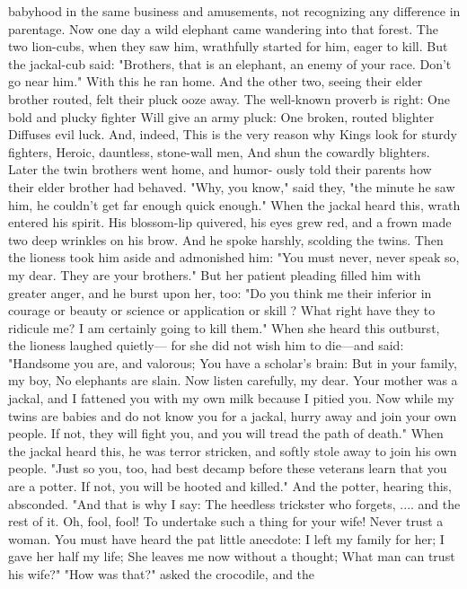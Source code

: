 \documentclass{book}
\begin{document}
babyhood in the same business and amusements, not
recognizing any difference in parentage.
Now one day a wild elephant came wandering
into that forest. The two lion-cubs, when they saw
him, wrathfully started for him, eager to kill. But
the jackal-cub said: "Brothers, that is an elephant,
an enemy of your race. Don't go near him." With
this he ran home. And the other two, seeing their
elder brother routed, felt their pluck ooze away. The
well-known proverb is right:
One bold and plucky fighter
Will give an army pluck:
One broken, routed blighter
Diffuses evil luck.
And, indeed,
This is the very reason why
Kings look for sturdy fighters,
Heroic, dauntless, stone-wall men,
And shun the cowardly blighters.
Later the twin brothers went home, and humor-
ously told their parents how their elder brother had
behaved. "Why, you know," said they, "the minute
he saw him, he couldn't get far enough quick enough."
When the jackal heard this, wrath entered his
spirit. His blossom-lip quivered, his eyes grew red,
and a frown made two deep wrinkles on his brow.
And he spoke harshly, scolding the twins.
Then the lioness took him aside and admonished
him: "You must never, never speak so, my dear.
They are your brothers." But her patient pleading
filled him with greater anger, and he burst upon her,
too: "Do you think me their inferior in courage or
beauty or science or application or skill ? What right
have they to ridicule me? I am certainly going to
kill them."
When she heard this outburst, the lioness laughed
quietly--- for she did not wish him to die---and said:
"Handsome you are, and valorous;
You have a scholar's brain:
But in your family, my boy,
No elephants are slain.
Now listen carefully, my dear. Your mother was a
jackal, and I fattened you with my own milk because
I pitied you. Now while my twins are babies and do
not know you for a jackal, hurry away and join your
own people. If not, they will fight you, and you will
tread the path of death." When the jackal heard this,
he was terror stricken, and softly stole away to join
his own people.
"Just so you, too, had best decamp before these
veterans learn that you are a potter. If not, you will
be hooted and killed." And the potter, hearing this,
absconded.
"And that is why I say:
The heedless trickster who forgets, ....
and the rest of it. Oh, fool, fool! To undertake such
a thing for your wife! Never trust a woman. You
must have heard the pat little anecdote:
I left my family for her;
I gave her half my life;
She leaves me now without a thought;
What man can trust his wife?"
"How was that?" asked the crocodile, and the
\end{document}
